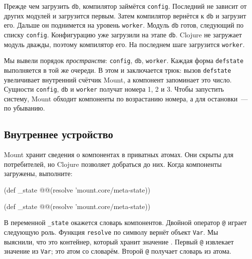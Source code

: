 \fi

Прежде чем загрузить \verb|db|, компилятор займётся \verb|config|. Последний
не зависит от других модулей и загрузится первым. Затем компилятор вернётся к
\verb|db| и загрузит его. Дальше он поднимется на уровень
\verb|worker|. Модуль \verb|db| готов, следующий по списку
\verb|config|. Конфигурацию уже загрузили на этапе \verb|db|. Clojure не
загружает модуль дважды, поэтому компилятор его. На последнем шаге
загрузится \verb|worker|.


Мы вывели порядок \emph{пространств}: \verb|config|, \verb|db|,
\verb|worker|. Каждая форма \verb|defstate| выполняется в той же очереди. В
этом и заключается трюк: вызов \verb|defstate| увеличивает внутренний счётчик
Mount, а компонент запоминает это число. Сущности \verb|config|, \verb|db| и
\verb|worker| получат номера 1, 2 и 3. Чтобы запустить систему, Mount
обходит компоненты по возрастанию номера, а для остановки~--- по убыванию.

\subsection{Внутреннее устройство}

Mount хранит сведения о компонентах в приватных атомах. Они скрыты для
потребителей, но Clojure позволяет добраться до них. Когда компоненты загружены,
выполните:

\ifx\DEVICETYPE\MOBILE

\begin{english}
  \begin{clojure}
(def _state
  @@(resolve 'mount.core/meta-state))
  \end{clojure}
\end{english}

\else

\begin{english}
  \begin{clojure}
(def _state @@(resolve 'mount.core/meta-state))
  \end{clojure}
\end{english}

\fi


В переменной \verb|_state| окажется словарь компонентов. Двойной оператор
\verb|@| играет следующую роль. Функция \verb|resolve| по символу вернёт
объект \verb|Var|. Мы выяснили, что это контейнер, который хранит
значение . Первый \verb|@| извлекает значение из
\verb|Var|; это атом со словарём. Второй \verb|@| получает словарь из атома.

